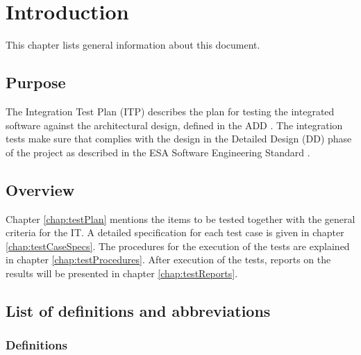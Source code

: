 \chapter{Introduction}
\label{chap:intro}
This chapter lists general information about this document.

\section{Purpose}
\label{sec:purpose}
The Integration Test Plan (ITP) describes the plan for testing the integrated software against the architectural design, defined in the ADD \cite{add}. The integration tests make sure that
\projectname{} complies with the design in the Detailed Design (DD) phase of the \projectname{} project as described in the ESA Software Engineering Standard \cite{esa}.

\section{Overview}
\label{sec:overview}
Chapter \ref{chap:testPlan} mentions the items to be tested together with the general criteria for the IT. A detailed specification for each test case is given in chapter \ref{chap:testCaseSpecs}. The procedures for the execution of the tests are explained in chapter \ref{chap:testProcedures}. After execution of the tests, reports on the results will be presented in chapter \ref{chap:testReports}.

\section{List of definitions and abbreviations}
\label{sec:listofdef}

\subsection{Definitions}
\label{subsec:def}

